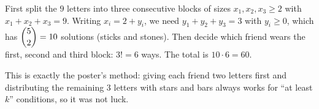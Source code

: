 First split the $9$ letters into three consecutive blocks of sizes $x_1,x_2,x_3\ge 2$ with $x_1+x_2+x_3=9$. Writing $x_i=2+y_i$, we need $y_1+y_2+y_3=3$ with $y_i\ge0$, which has $\dbinom{5}{2}=10$ solutions (sticks and stones). Then decide which friend wears the first, second and third block: $3!=6$ ways. The total is $10\cdot 6=\boxed{60}$.

This is exactly the poster's method: giving each friend two letters first and distributing the remaining $3$ letters with stars and bars always works for ``at least $k$'' conditions, so it was not luck.
